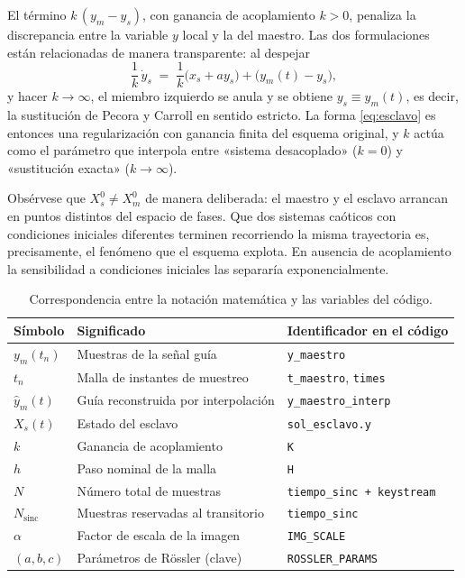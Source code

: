 \documentclass[12pt,a4paper]{article}
\newenvironment{observacion}[1][]%
  {\if\relax\detokenize{#1}\relax \observacionaux \else \observacionaux[#1]\fi
   \normalfont}%
  {\endobservacionaux}
\begin{document}
El término $k\,(y_m - y_s)$, con ganancia de acoplamiento $k>0$, penaliza la
discrepancia entre la variable $y$ local y la del maestro. Las dos formulaciones
están relacionadas de manera transparente: al despejar
\[
  \frac{1}{k}\,\dot{y}_s \;=\; \frac{1}{k}\bigl(x_s + a y_s\bigr) + \bigl(y_m(t) - y_s\bigr),
\]
y hacer $k \to \infty$, el miembro izquierdo se anula y se obtiene
$y_s \equiv y_m(t)$, es decir, la sustitución de Pecora y Carroll en sentido
estricto. La forma \eqref{eq:esclavo} es entonces una regularización con ganancia
finita del esquema original, y $k$ actúa como el parámetro que interpola entre
«sistema desacoplado» ($k=0$) y «sustitución exacta» ($k\to\infty$).

\begin{observacion}
Obsérvese que $X_s^0 \neq X_m^0$ de manera deliberada: el maestro y el esclavo
arrancan en puntos distintos del espacio de fases. Que dos sistemas caóticos con
condiciones iniciales diferentes terminen recorriendo la misma trayectoria es,
precisamente, el fenómeno que el esquema explota. En ausencia de acoplamiento la
sensibilidad a condiciones iniciales las separaría exponencialmente.
\end{observacion}

\begin{table}[H]
\centering
\caption{Correspondencia entre la notación matemática y las variables del código.}
\label{tab:notacion}
\begin{tabular}{@{}lll@{}}
\toprule
\textbf{Símbolo} & \textbf{Significado} & \textbf{Identificador en el código} \\
\midrule
$y_m(t_n)$        & Muestras de la señal guía              & \texttt{y\_maestro} \\
$t_n$             & Malla de instantes de muestreo         & \texttt{t\_maestro}, \texttt{times} \\
$\hat{y}_m(t)$    & Guía reconstruida por interpolación    & \texttt{y\_maestro\_interp} \\
$X_s(t)$          & Estado del esclavo                     & \texttt{sol\_esclavo.y} \\
$k$               & Ganancia de acoplamiento               & \texttt{K} \\
$h$               & Paso nominal de la malla               & \texttt{H} \\
$N$               & Número total de muestras               & \texttt{tiempo\_sinc + keystream} \\
$N_{\mathrm{sinc}}$ & Muestras reservadas al transitorio   & \texttt{tiempo\_sinc} \\
$\alpha$          & Factor de escala de la imagen          & \texttt{IMG\_SCALE} \\
$(a,b,c)$         & Parámetros de Rössler (clave)          & \texttt{ROSSLER\_PARAMS} \\
\bottomrule
\end{tabular}
\end{table}
\end{document}
